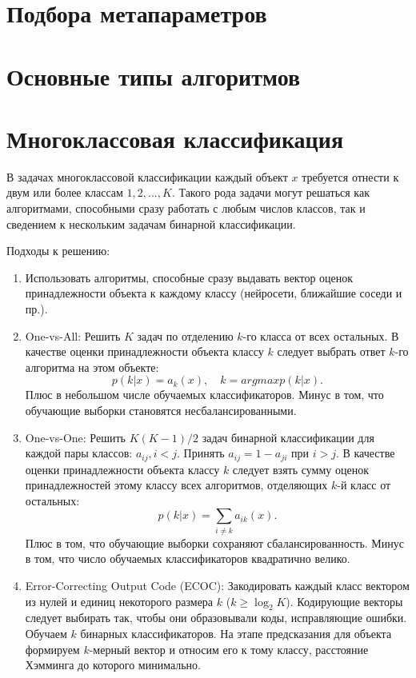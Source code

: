 \section{Подбора метапараметров}


\section{Основные типы алгоритмов}


\section{Многоклассовая классификация}

В задачах многоклассовой классификации каждый объект $x$ требуется отнести к двум или более классам $1, 2, ..., K$.
Такого рода задачи могут решаться как алгоритмами, способными сразу работать с любым числов классов, так и сведением к нескольким задачам бинарной классификации.

Подходы к решению:

\begin{enumerate}
    \item Использовать алгоритмы, способные сразу выдавать вектор оценок принадлежности объекта к каждому классу (нейросети, ближайшие соседи и пр.).
    \item One-vs-All: Решить $K$ задач по отделению $k$-го класса от всех остальных. В качестве оценки принадлежности объекта классу $k$ следует выбрать ответ $k$-го алгоритма на этом объекте:
$$
p(k|x) = a_k(x), \quad k = argmax p(k|x).
$$
Плюс в небольшом числе обучаемых классификаторов. Минус в том, что обучающие выборки становятся несбалансированными.
    \item One-vs-One: Решить $K(K-1)/2$ задач бинарной классификации для каждой пары классов: $a_{ij}, i<j$. Принять $a_{ij} = 1 - a_{ji}$ при $i>j$. В качестве оценки принадлежности объекта классу $k$ следует взять сумму оценок принадлежностей этому классу всех алгоритмов, отделяющих $k$-й класс от остальных:
$$
p(k|x) = \sum_{i \neq k}a_{ik}(x).
$$
Плюс в том, что обучающие выборки сохраняют сбалансированность. Минус в том, что число обучаемых классификаторов квадратично велико.
    \item Error-Correcting Output Code (ECOC): Закодировать каждый класс вектором из нулей и единиц некоторого размера $k$ ($k\geqslant\log_2K$). Кодирующие векторы следует выбирать так, чтобы они образовывали коды, исправляющие ошибки. Обучаем $k$ бинарных классификаторов. На этапе предсказания для объекта формируем $k$-мерный вектор и относим его к тому классу, расстояние Хэмминга до которого минимально. 
\end{enumerate}


